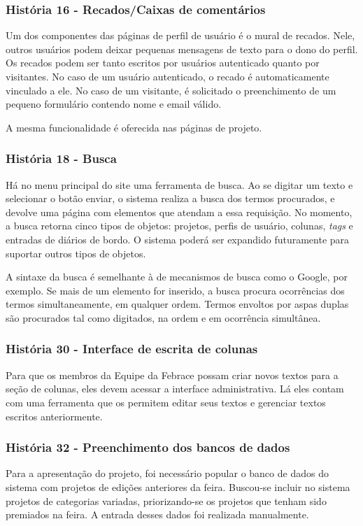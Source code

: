    \subsubsection{História 16 - Recados/Caixas de comentários}
      Um dos componentes das páginas de perfil de usuário é o mural de recados. Nele, outros usuários podem deixar pequenas mensagens de texto para o dono do perfil. Os recados podem ser tanto escritos por usuários autenticado quanto por visitantes. No caso de um usuário autenticado, o recado é automaticamente vinculado a ele. No caso de um visitante, é solicitado o preenchimento de um pequeno formulário contendo nome e email válido.

      A mesma funcionalidade é oferecida nas páginas de projeto.

    \subsubsection{História 18 - Busca}
      Há no menu principal do site uma ferramenta de busca. Ao se digitar um texto e selecionar o botão enviar, o sistema realiza a busca dos termos procurados, e devolve uma página com elementos que atendam a essa requisição. No momento, a busca retorna cinco tipos de objetos: projetos, perfis de usuário, colunas, \textit{tags} e entradas de diários de bordo. O sistema poderá ser expandido futuramente para suportar outros tipos de objetos.

      A sintaxe da busca é semelhante à de mecanismos de busca como o Google, por exemplo. Se mais de um elemento for inserido, a busca procura ocorrências dos termos simultaneamente, em qualquer ordem. Termos envoltos por aspas duplas são procurados tal como digitados, na ordem e em ocorrência simultânea.

    \subsubsection{História 30 - Interface de escrita de colunas}
      Para que os membros da Equipe da Febrace possam criar novos textos para a seção de colunas, eles devem acessar a interface administrativa. Lá eles contam com uma ferramenta que os permitem editar seus textos e gerenciar textos escritos anteriormente.

    \subsubsection{História 32 - Preenchimento dos bancos de dados}
      Para a apresentação do projeto, foi necessário popular o banco de dados do sistema com projetos de edições anteriores da feira. Buscou-se incluir no sistema projetos de categorias variadas, priorizando-se os projetos que tenham sido premiados na feira. A entrada desses dados foi realizada manualmente.

